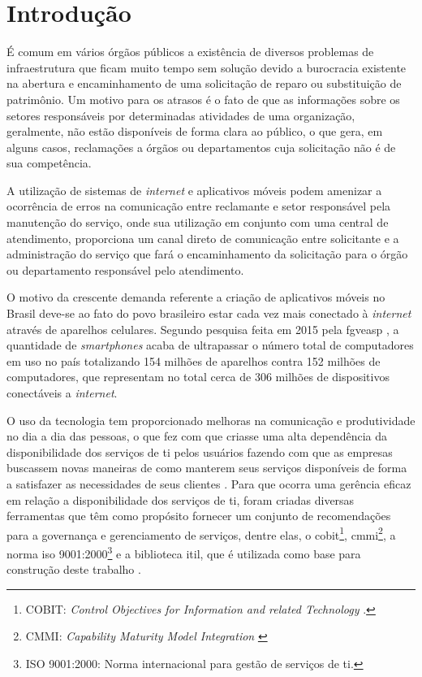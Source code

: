 \chapter{Introdução}

\noindent É comum em vários órgãos públicos a existência de diversos problemas de infraestrutura que ficam muito tempo sem solução devido a burocracia existente na abertura e encaminhamento de uma solicitação de reparo ou substituição de patrimônio.
Um motivo para os atrasos é o fato de que as informações sobre os setores responsáveis por determinadas atividades de uma organização, geralmente, não estão disponíveis de forma clara ao público, o que gera, em alguns casos, reclamações a órgãos ou departamentos cuja solicitação não é de sua competência.

A utilização de sistemas de \textit{internet} e aplicativos móveis podem amenizar a ocorrência de erros na comunicação entre reclamante e setor responsável pela manutenção do serviço, onde sua utilização em conjunto com uma central de atendimento, proporciona um canal direto de comunicação entre solicitante e a administração do serviço que fará o encaminhamento da solicitação para o órgão ou departamento responsável pelo atendimento. 

O motivo da crescente demanda referente a criação de aplicativos móveis no Brasil deve-se ao fato do povo brasileiro estar cada vez mais conectado à \textit{internet} através de aparelhos celulares. Segundo pesquisa feita em 2015 pela \gls{fgveasp} \cite{pesquisa-fgv}, a quantidade de \textit{smartphones} acaba de ultrapassar o número total de computadores em uso no país totalizando 154 milhões de aparelhos contra 152 milhões de computadores, que representam no total cerca de 306 milhões de dispositivos conectáveis a \textit{internet}.

O uso da tecnologia tem proporcionado melhoras na comunicação e produtividade no dia a dia das pessoas, o que fez com que criasse uma alta dependência da disponibilidade dos serviços de \gls{ti} pelos usuários fazendo com que as empresas buscassem novas maneiras de como manterem seus serviços disponíveis de forma a satisfazer as necessidades de seus clientes \cite{introductoryoverviewofitil}. Para que ocorra uma gerência eficaz em relação a disponibilidade dos serviços de \acrshort{ti}, foram criadas diversas ferramentas que têm como propósito fornecer um conjunto de recomendações para a governança e gerenciamento de serviços, dentre elas, o \gls{cobit}\footnote{COBIT: \textit{Control Objectives for Information and related Technology} \cite{bernard2012cobit}.}, \gls{cmmi}\footnote{CMMI: \textit{Capability Maturity Model Integration} \cite{Chrissis:2003:CGP:773274}}, a norma \gls{iso} 9001:2000\footnote{ISO 9001:2000: Norma internacional para gestão de serviços de \acrshort{ti}\cite{servicestrategy}.} e a biblioteca \gls{itil}, que é utilizada como base para construção deste trabalho \cite{abreu2012implantando, servicestrategy}.

